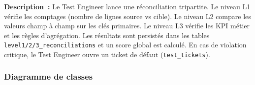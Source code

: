 \noindent\textbf{Description~:} Le Test Engineer lance une réconciliation tripartite. Le niveau L1 vérifie les comptages (nombre de lignes source vs cible). Le niveau L2 compare les valeurs champ à champ sur les clés primaires. Le niveau L3 vérifie les KPI métier et les règles d'agrégation. Les résultats sont persistés dans les tables \texttt{level1/2/3\_reconciliations} et un score global est calculé. En cas de violation critique, le Test Engineer ouvre un ticket de défaut (\texttt{test\_tickets}).

\subsubsection{Diagramme de classes}
\label{subsubsec:class-diagram}

